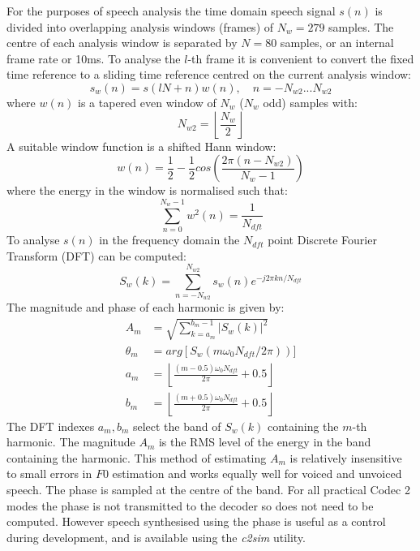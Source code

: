 \documentclass{article}
\begin{document}
For the purposes of speech analysis the time domain speech signal $s(n)$ is divided into overlapping analysis windows (frames) of $N_w=279$ samples. The centre of each analysis window is separated by $N=80$ samples, or an internal frame rate or 10ms. To analyse the $l$-th frame it is convenient to convert the fixed time reference to a sliding time reference centred on the current analysis window:
\begin{equation}
s_w(n) = s(lN + n) w(n), \quad n = - N_{w2} ... N_{w2}
\end{equation}
where $w(n)$ is a tapered even window of $N_w$ ($N_w$ odd) samples with:
\begin{equation}
N_{w2} = \left \lfloor \frac{N_w}{2} \right \rfloor
\end{equation}
A suitable window function is a shifted Hann window:
\begin{equation}
w(n) = \frac{1}{2} - \frac{1}{2} cos \left(\frac{2 \pi (n- N_{w2})}{N_w-1} \right)
\end{equation}
where the energy in the window is normalised such that:
\begin{equation}
\sum_{n=0}^{N_w-1}w^2(n) = \frac{1}{N_{dft}}
\end{equation}
To analyse $s(n)$ in the frequency domain the $N_{dft}$ point Discrete Fourier Transform (DFT) can be computed:
\begin{equation}
S_w(k) = \sum_{n=-N_{w2}}^{N_{w2}} s_w(n) e^{-j 2 \pi k n / N_{dft}}
\end{equation}
The magnitude and phase of each harmonic is given by:
\begin{equation}
\label{eq:mag_est}
\begin{split}
A_m      &= \sqrt{\sum_{k=a_m}^{b_m-1} |S_w(k)|^2 } \\
\theta_m &= arg \left[ S_w(m \omega_0 N_{dft} / 2 \pi) \right)] \\
a_m      &= \left \lfloor \frac{(m - 0.5)\omega_0 N_{dft}}{2 \pi} + 0.5 \right \rfloor \\
b_m      &= \left \lfloor \frac{(m + 0.5)\omega_0 N_{dft}}{2 \pi} + 0.5 \right \rfloor
\end{split}
\end{equation}
The DFT indexes $a_m, b_m$ select the band of $S_w(k)$ containing the $m$-th harmonic. The magnitude $A_m$ is the RMS level of the energy in the band containing the harmonic.  This method of estimating $A_m$ is relatively insensitive to small errors in $F0$ estimation and works equally well for voiced and unvoiced speech. The phase is sampled at the centre of the band.  For all practical Codec 2 modes the phase is not transmitted to the decoder so does not need to be computed.  However speech synthesised using the phase is useful as a control during development, and is available using the \emph{c2sim} utility.
\end{document}
